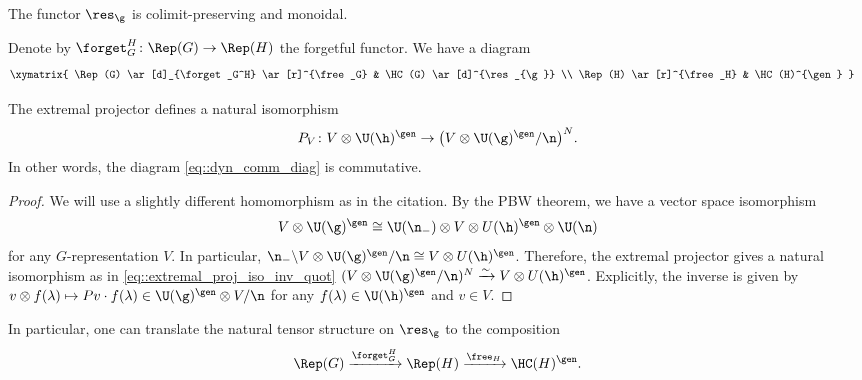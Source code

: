 	\begin{Theorem}
		\label{thm::res_exact_monoidal}
		The functor $\res_{\g}$ is colimit-preserving and monoidal.
	\end{Theorem}
	
	
	
	Denote by $\forget_G^H\colon \Rep(G) \rightarrow \Rep(H)$ the forgetful functor. We have a diagram
	\begin{equation}
		\label{eq::dyn_comm_diag}
\begin{split}&
		\xymatrix{
			\Rep(G) \ar[d]_{\forget_G^H} \ar[r]^{\free_G} & \HC(G) \ar[d]^{\res_{\g}} \\
			\Rep(H) \ar[r]^{\free_H} & \HC(H)^{\gen}
		}
\end{split}
	\end{equation}
	
	\begin{Theorem}
		\label{thm::dynamical_trivialization}
		The extremal projector defines a natural isomorphism
		\[
		P_V\colon V \otimes \U(\h)^{\gen} \rightarrow \bigl(V \otimes \U(\g)^{\gen} /\n\bigr)^{N}.
		\]
		In other words, the diagram \eqref{eq::dyn_comm_diag} is commutative.
		\begin{proof}
			We will use a slightly different homomorphism as in the citation. By the PBW theorem, we have a vector space isomorphism
			\[
			V \otimes \U(\g)^{\gen} \cong \U(\n_-) \otimes V \otimes U(\h)^{\gen} \otimes \U(\n)
			\]
			for any $G$-representation $V$. In particular,
$
			\n_- \backslash V \otimes \U(\g)^{\gen} / \n \cong V \otimes U(\h)^{\gen}$.
			Therefore, the extremal projector gives a natural isomorphism as in \eqref{eq::extremal_proj_iso_inv_quot}
$
			(V \otimes \U(\g)^{\gen} / \n)^{N} \xrightarrow{\sim} V \otimes U(\h)^{\gen}$.
			Explicitly, the inverse is given by
$
			v \otimes f(\lambda) \mapsto P v \cdot f(\lambda)\in \U(\g)^{\gen} \otimes V / \n
$
			for any $f(\lambda)\in \U(\h)^{\gen}$ and $v\in V$.
		\end{proof}
	\end{Theorem}
	
	In particular, one can translate the natural tensor structure on $\res_{\g}$ to the composition
	\[
	\Rep(G) \xrightarrow{\forget_G^H} \Rep(H) \xrightarrow{\free_H} \HC(H)^{\gen}.
	\]
	
